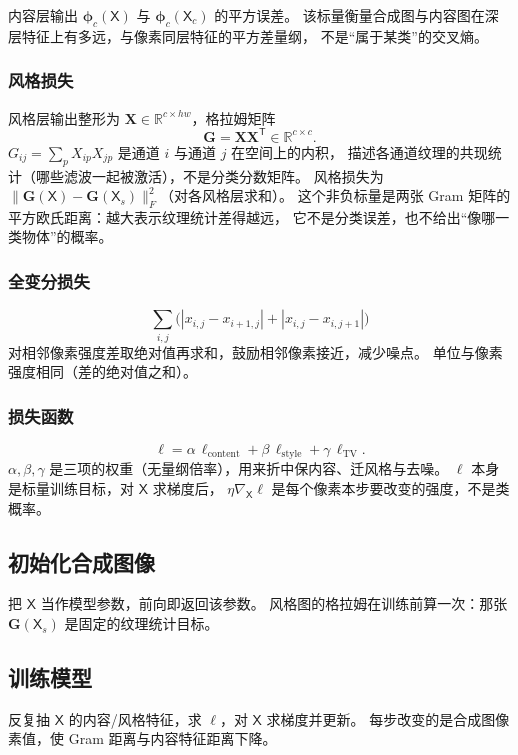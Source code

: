 内容层输出 $\bm{\phi}_c(\mathsf{X})$ 与 $\bm{\phi}_c(\mathsf{X}_c)$ 的平方误差。
该标量衡量合成图与内容图在深层特征上有多远，与像素同层特征的平方差量纲，
不是“属于某类”的交叉熵。

\subsubsection{风格损失}

风格层输出整形为 $\bm{X}\in\mathbb{R}^{c\times hw}$，格拉姆矩阵
\[
\bm{G}=\bm{X}\bm{X}^{\mathsf T}\in\mathbb{R}^{c\times c}.
\]
$G_{ij}=\sum_{p}X_{ip}X_{jp}$ 是通道 $i$ 与通道 $j$ 在空间上的内积，
描述各通道纹理的共现统计（哪些滤波一起被激活），不是分类分数矩阵。
风格损失为 $\bigl\|\bm{G}(\mathsf{X})-\bm{G}(\mathsf{X}_s)\bigr\|_F^2$（对各风格层求和）。
这个非负标量是两张 Gram 矩阵的平方欧氏距离：越大表示纹理统计差得越远，
它不是分类误差，也不给出“像哪一类物体”的概率。

\subsubsection{全变分损失}

\[
\sum_{i,j}
\bigl(|x_{i,j}-x_{i+1,j}|+|x_{i,j}-x_{i,j+1}|\bigr)
\]
对相邻像素强度差取绝对值再求和，鼓励相邻像素接近，减少噪点。
单位与像素强度相同（差的绝对值之和）。

\subsubsection{损失函数}

\[
\ell
=
\alpha\,\ell_{\mathrm{content}}
+\beta\,\ell_{\mathrm{style}}
+\gamma\,\ell_{\mathrm{TV}}.
\]
$\alpha,\beta,\gamma$ 是三项的权重（无量纲倍率），用来折中保内容、迁风格与去噪。
$\ell$ 本身是标量训练目标，对 $\mathsf{X}$ 求梯度后，
$\eta\nabla_{\mathsf{X}}\ell$ 是每个像素本步要改变的强度，不是类概率。

\subsection{初始化合成图像}

把 $\mathsf{X}$ 当作模型参数，前向即返回该参数。
风格图的格拉姆在训练前算一次：那张 $\bm{G}(\mathsf{X}_s)$ 是固定的纹理统计目标。

\subsection{训练模型}

反复抽 $\mathsf{X}$ 的内容/风格特征，求 $\ell$，对 $\mathsf{X}$ 求梯度并更新。
每步改变的是合成图像素值，使 Gram 距离与内容特征距离下降。

